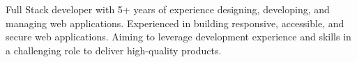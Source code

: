 

Full Stack developer with 5+ years of experience designing, developing, and managing web applications. Experienced in building responsive, accessible, and secure web applications. Aiming to leverage development experience and skills in a challenging role to deliver high-quality products.